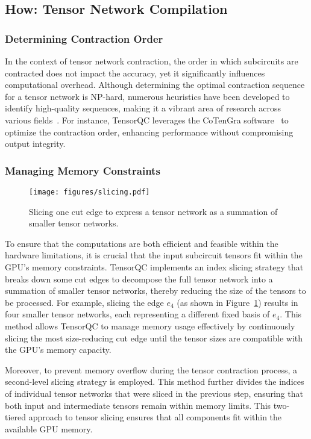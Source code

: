 \subsection{How: Tensor Network Compilation}\label{sec:tensor_network_compilation}
\subsubsection{Determining Contraction Order}\label{sec:determining_contraction_order}
In the context of tensor network contraction,
the order in which subcircuits are contracted does not impact the accuracy,
yet it significantly influences computational overhead.
Although determining the optimal contraction sequence for a tensor network is NP-hard,
numerous heuristics have been developed to identify high-quality sequences,
making it a vibrant area of research across various fields~\cite{robertson1991graph,markov2008simulating,orus2014practical}.
For instance, TensorQC leverages the CoTenGra software~\cite{gray2021hyper} to optimize the contraction order,
enhancing performance without compromising output integrity.

\subsubsection{Managing Memory Constraints}
\begin{figure}[t]
    \centering
    \texttt{[image: figures/slicing.pdf]}
    \caption{Slicing one cut edge to express a tensor network as a summation of smaller tensor networks.}
    \label{fig:slicing}
\end{figure}

To ensure that the computations are both efficient and feasible within the hardware limitations,
it is crucial that the input subcircuit tensors fit within the GPU's memory constraints.
TensorQC implements an index slicing strategy that breaks down some cut edges to decompose the full tensor network into a summation of smaller tensor networks,
thereby reducing the size of the tensors to be processed.
For example, slicing the edge $e_4$ (as shown in Figure~\ref{fig:slicing}) results in four smaller tensor networks,
each representing a different fixed basis of $e_4$.
This method allows TensorQC to manage memory usage effectively by continuously slicing the most size-reducing cut edge until the tensor sizes are compatible with the GPU's memory capacity.

Moreover, to prevent memory overflow during the tensor contraction process,
a second-level slicing strategy is employed.
This method further divides the indices of individual tensor networks that were sliced in the previous step,
ensuring that both input and intermediate tensors remain within memory limits.
This two-tiered approach to tensor slicing ensures that all components fit within the available GPU memory.